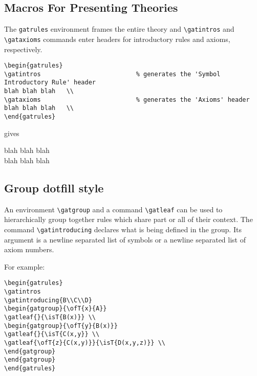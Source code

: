 \documentclass[10pt,a4paper]{article}
\begin{document}
\subsection{Macros For Presenting Theories}

The \verb'gatrules' environment frames the entire theory and \verb'\gatintros' and
\verb'\gataxioms' commands enter headers for introductory rules and axioms, respectively.

\begin{verbatim}
\begin{gatrules}
\gatintros                          % generates the 'Symbol Introductory Rule' header
blah blah blah   \\                   
\gataxioms                          % generates the 'Axioms' header
blah blah blah   \\
\end{gatrules}
\end{verbatim}
gives
\begin{gatrules}
\gatintros                          %
blah blah blah   \\                   
\gataxioms                          %
blah blah blah   \\
\end{gatrules}

\subsection{Group dotfill style}

An environment \verb'\gatgroup' and a command \verb'\gatleaf'  can be used to hierarchically group together rules which share part or all of their context. The command \verb'\gatintroducing' declares what is being defined in the group. Its argument is a newline separated list of symbols or a newline separated list of axiom numbers.

For example:
\begin{verbatim}
\begin{gatrules}
\gatintros
\gatintroducing{B\\C\\D}
\begin{gatgroup}{\ofT{x}{A}}
\gatleaf{}{\isT{B(x)}} \\
\begin{gatgroup}{\ofT{y}{B(x)}}
\gatleaf{}{\isT{C(x,y}} \\
\gatleaf{\ofT{z}{C(x,y)}}{\isT{D(x,y,z)}} \\
\end{gatgroup}
\end{gatgroup}
\end{gatrules}
\end{verbatim}
\end{document}
